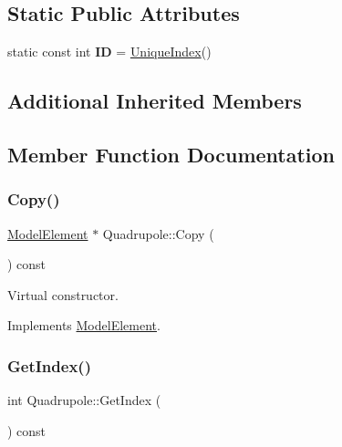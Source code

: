 \subsection*{Static Public Attributes}
\begin{DoxyCompactItemize}
\item 
\mbox{\label{classQuadrupole_ab9522c1df4abde43ca118fb4ea62fd59}} 
static const int {\bfseries ID} = \hyperlink{classAcceleratorComponent_aa7ad4d39e1a488b705983842ed1ac784}{Unique\+Index}()
\end{DoxyCompactItemize}
\subsection*{Additional Inherited Members}


\subsection{Member Function Documentation}
\mbox{\label{classQuadrupole_aed92f774f225e5dbc2b88d3f928d6d9e}} 
\subsubsection{\texorpdfstring{Copy()}{Copy()}}
{\footnotesize\ttfamily \hyperlink{classModelElement}{Model\+Element} $\ast$ Quadrupole\+::\+Copy (\begin{DoxyParamCaption}{ }\end{DoxyParamCaption}) const\hspace{0.3cm}{\ttfamily [virtual]}}

Virtual constructor. 

Implements \hyperlink{classModelElement_ac3ca26d649bd86a0f31a58ae09941429}{Model\+Element}.

\mbox{\label{classQuadrupole_a39b9e323df34c8db56f6daaaa112cf06}} 
\subsubsection{\texorpdfstring{Get\+Index()}{GetIndex()}}
{\footnotesize\ttfamily int Quadrupole\+::\+Get\+Index (\begin{DoxyParamCaption}{ }\end{DoxyParamCaption}) const\hspace{0.3cm}{\ttfamily [virtual]}}

